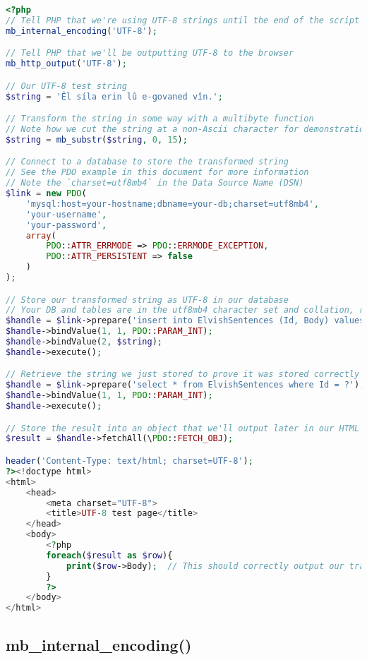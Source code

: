 \begin{lstlisting}[language=PHP]
<?php
// Tell PHP that we're using UTF-8 strings until the end of the script
mb_internal_encoding('UTF-8');

// Tell PHP that we'll be outputting UTF-8 to the browser
mb_http_output('UTF-8');

// Our UTF-8 test string
$string = 'Êl síla erin lû e-govaned vîn.';

// Transform the string in some way with a multibyte function
// Note how we cut the string at a non-Ascii character for demonstration purposes
$string = mb_substr($string, 0, 15);

// Connect to a database to store the transformed string
// See the PDO example in this document for more information
// Note the `charset=utf8mb4` in the Data Source Name (DSN)
$link = new PDO(
    'mysql:host=your-hostname;dbname=your-db;charset=utf8mb4',
    'your-username',
    'your-password',
    array(
        PDO::ATTR_ERRMODE => PDO::ERRMODE_EXCEPTION,
        PDO::ATTR_PERSISTENT => false
    )
);

// Store our transformed string as UTF-8 in our database
// Your DB and tables are in the utf8mb4 character set and collation, right?
$handle = $link->prepare('insert into ElvishSentences (Id, Body) values (?, ?)');
$handle->bindValue(1, 1, PDO::PARAM_INT);
$handle->bindValue(2, $string);
$handle->execute();

// Retrieve the string we just stored to prove it was stored correctly
$handle = $link->prepare('select * from ElvishSentences where Id = ?');
$handle->bindValue(1, 1, PDO::PARAM_INT);
$handle->execute();

// Store the result into an object that we'll output later in our HTML
$result = $handle->fetchAll(\PDO::FETCH_OBJ);

header('Content-Type: text/html; charset=UTF-8');
?><!doctype html>
<html>
    <head>
        <meta charset="UTF-8">
        <title>UTF-8 test page</title>
    </head>
    <body>
        <?php
        foreach($result as $row){
            print($row->Body);  // This should correctly output our transformed UTF-8 string to the browser
        }
        ?>
    </body>
</html>
\end{lstlisting}


\subsection{mb\_internal\_encoding()}


